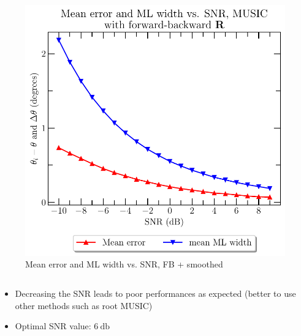 \documentclass[UKenglish,8pt,aspectratio=1610]{beamer}
\begin{document}
\begin{frame}
\begin{columns}
\begin{column}{0.5\textwidth}
\begin{figure}[h!]
		\includegraphics[scale=0.35]{snr_analysis/mean_error_and_resolution_vs_snr_forward_backward_correlation_matrix}
		\caption{Mean error and ML width vs. SNR, FB + smoothed}
	\end{figure}
	\end{column}
\end{columns}
\begin{itemize}
	\item Decreasing the SNR leads to poor performances as expected (better to use other methods such as root MUSIC)
	\item Optimal SNR value: $6~\si{\decibel}$
\end{itemize}
\end{frame}
\end{document}
